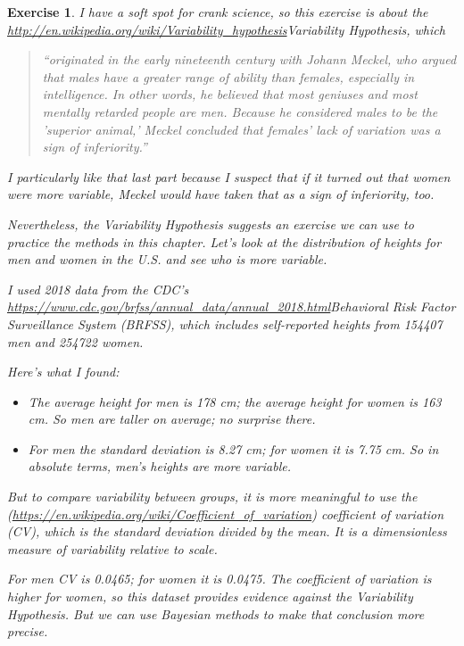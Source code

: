 \documentclass[12pt]{book}
\theoremstyle{exercise}
\newtheorem{exercise}{Exercise}[chapter]
\begin{document}
\begin{exercise} 
I have a soft spot for crank science, so this
exercise is about the
\url{http://en.wikipedia.org/wiki/Variability_hypothesis}{Variability
Hypothesis}, which

\begin{quote}
``originated in the early nineteenth century with Johann Meckel, who
argued that males have a greater range of ability than females,
especially in intelligence. In other words, he believed that most
geniuses and most mentally retarded people are men. Because he
considered males to be the 'superior animal,' Meckel concluded that
females' lack of variation was a sign of inferiority.''
\end{quote}

I particularly like that last part because I suspect that if it turned
out that women were \emph{more} variable, Meckel would have taken that
as a sign of inferiority, too.

Nevertheless, the Variability Hypothesis suggests an exercise we can use
to practice the methods in this chapter. Let's look at the distribution
of heights for men and women in the U.S. and see who is more variable.

I used 2018 data from the CDC's
\url{https://www.cdc.gov/brfss/annual_data/annual_2018.html}{Behavioral
Risk Factor Surveillance System} (BRFSS), which includes self-reported
heights from 154407 men and 254722 women.

Here's what I found:

\begin{itemize}
\item
  The average height for men is 178 cm; the average height for women is
  163 cm. So men are taller on average; no surprise there.
\item
  For men the standard deviation is 8.27 cm; for women it is 7.75 cm. So
  in absolute terms, men's heights are more variable.
\end{itemize}

But to compare variability between groups, it is more meaningful to use
the
(\url{https://en.wikipedia.org/wiki/Coefficient_of_variation}) coefficient
of variation (CV), which is the standard deviation divided by the mean.
It is a dimensionless measure of variability relative to scale.

For men CV is 0.0465; for women it is 0.0475. The coefficient of
variation is higher for women, so this dataset provides evidence against
the Variability Hypothesis. But we can use Bayesian methods to make that
conclusion more precise.


\end{exercise}
\end{document}
